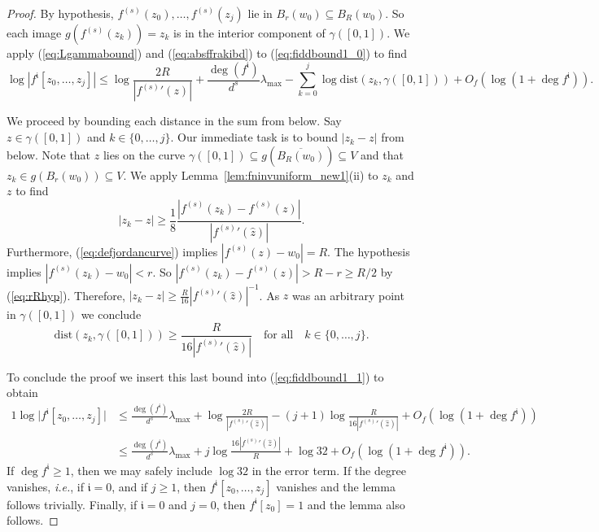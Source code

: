 \documentclass[12pt,oneside,a4]{amsart}
\numberwithin{maincounter}{section}
\numberwithin{equation}{section}
\renewcommand{\subset}{\subseteq}
\begin{document}
\begin{proof}
  By hypothesis, 
  $f^{(s)}(z_0),\ldots,f^{(s)}(z_j)$ lie in $B_{r}(w_0)\subset
  B_R(w_0)$.
  So each image $g(f^{(s)}(z_k))=z_k$ is in the 
  interior 
  component of $\gamma([0,1])$.  
  We apply (\ref{eq:Lgammabound}) and (\ref{eq:absffrakibd}) to
  (\ref{eq:fiddbound1_0}) to find
  \begin{equation}
    \label{eq:fiddbound1_1}
    \log |f^{\mathfrak{i}}[z_0,\ldots,z_j]| \le
    \log \frac{2R}{|{f^{(s)}}'(z)|} + \frac{\deg
      (f^{\mathfrak{i}})}{d^s}\lambda_{\mathrm{max}} -\sum_{k=0}^j \log
    \mathrm{dist}(z_k,\gamma([0,1])) + O_f(\log(1+  \deg f^{\mathfrak
      i})).  
  \end{equation}
  
  
  We proceed by bounding each distance in the sum from below. 
  Say $z\in \gamma([0,1])$ and $k\in \{0,\ldots,j\}$.
  Our immediate task is to bound $|z_k-z|$ from below.  
  Note that $z$ lies on the curve $\gamma([0,1])\subset
  g(\overline{B_{R}(w_0)})\subset V$ and that
  $z_k \in g(B_r(w_0))\subset V$.
  We apply
  Lemma~\ref{lem:fninvuniform_new1}(ii) to $z_k$ and $z$ to find
  \begin{equation*}
    |z_k-z|\ge \frac 18
    \frac{|f^{(s)}(z_k)-f^{(s)}(z)|}{|{f^{(s)}}'(\widehat z)|}.
  \end{equation*}
  Furthermore,
  (\ref{eq:defjordancurve}) implies
  $|f^{(s)}(z)-w_0|=R$. The hypothesis 
  implies $|f^{(s)}(z_k)-w_0|<r$.
  So
  $|f^{(s)}(z_k)-f^{(s)}(z)|>R-r\ge R/2$ by (\ref{eq:rRhyp}). Therefore,
  $|z_k-z| \ge \frac{R}{16} |{f^{(s)}}'(\widehat z)|^{-1}$. As $z$
  was an arbitrary point in $\gamma([0,1])$ we conclude
  \begin{equation*}
    \mathrm{dist}(z_k,\gamma([0,1])) \ge
    \frac{R}{16{|{f^{(s)}}'(\widehat z)|}}\quad\text{for all}\quad
    k\in \{0,\ldots,j\}. 
  \end{equation*}

  To conclude the proof we insert this last bound into
  (\ref{eq:fiddbound1_1}) to
  obtain
  \begin{alignat*}1
    \log \bigl|f^{\mathfrak{i}}[z_0,\ldots,z_j]\bigr| &\le
    \frac{\deg (f^{\mathfrak{i}})}{d^s}    \lambda_{\mathrm{max}} 
    + \log\frac{2R}{|{f^{(s)}}'(\widehat z)|} -
    (j+1)\log\frac{R}{16|{f^{(s)}}'(\widehat z)|}+O_f(\log(1+\deg
    f^{\mathfrak{i}}))\\
    &\le  \frac{\deg (f^{\mathfrak{i}})}{d^s}\lambda_{\mathrm{max}}
    + j \log\frac{16 |{f^{(s)}}'(\widehat z)|}{R} + \log 32
    +O_f(\log(1+\deg
    f^{\mathfrak{i}})).
  \end{alignat*}
  If $\deg f^{\mathfrak{i}}\ge 1$, then we may safely include $\log
  32$ in the error term. If the degree vanishes, \textit{i.e.}, if
  $\mathfrak i=0$, and if $j\ge 1$, then
  $f^{\mathfrak{i}}[z_0,\ldots,z_j]$ vanishes and the lemma follows
  trivially.
  Finally, if $\mathfrak i=0$ and  $j=0$, then $f^{\mathfrak
    i}[z_0]=1$ and the lemma also follows.
\end{proof}
\end{document}

